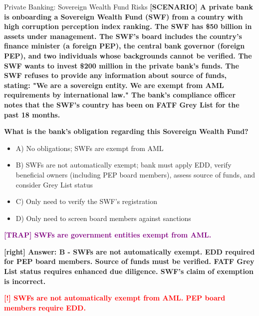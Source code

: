 \documentclass[11pt,a4paper]{beamer}
\newcommand{\redflag}[1]{\textcolor{red}{\textbf{[!] #1}}}
\newcommand{\trap}[1]{\textcolor{purple}{\textbf{[TRAP] #1}}}
\newcommand{\correct}[1]{\textcolor{green!50!black}{\textbf{[right] #1}}}
\newcommand{\scenario}[1]{\textcolor{blue!70!black}{\textbf{[SCENARIO] #1}}}
\begin{document}
	
	\begin{frame}{Private Banking: Sovereign Wealth Fund Risks}
		\tiny
		\scenario{A private bank is onboarding a Sovereign Wealth Fund (SWF) from a country with high corruption perception index ranking. The SWF has \$50 billion in assets under management. The SWF's board includes the country's finance minister (a foreign PEP), the central bank governor (foreign PEP), and two individuals whose backgrounds cannot be verified. The SWF wants to invest \$200 million in the private bank's funds. The SWF refuses to provide any information about source of funds, stating: "We are a sovereign entity. We are exempt from AML requirements by international law." The bank's compliance officer notes that the SWF's country has been on FATF Grey List for the past 18 months.}
		
		\vspace{0.02cm}
		\textbf{What is the bank's obligation regarding this Sovereign Wealth Fund?}
		\vspace{0.02cm}
		
		\begin{itemize}
			\item A) No obligations; SWFs are exempt from AML
			\item B) SWFs are not automatically exempt; bank must apply EDD, verify beneficial owners (including PEP board members), assess source of funds, and consider Grey List status
			\item C) Only need to verify the SWF's registration
			\item D) Only need to screen board members against sanctions
		\end{itemize}
		
		\vspace{0.02cm}
		\trap{SWFs are government entities exempt from AML.}
		
		\vspace{0.02cm}
		\correct{Answer: B - SWFs are not automatically exempt. EDD required for PEP board members. Source of funds must be verified. FATF Grey List status requires enhanced due diligence. SWF's claim of exemption is incorrect.}
		
		\vspace{0.02cm}
		\redflag{SWFs are not automatically exempt from AML. PEP board members require EDD.}
	\end{frame}
	
\end{document}
